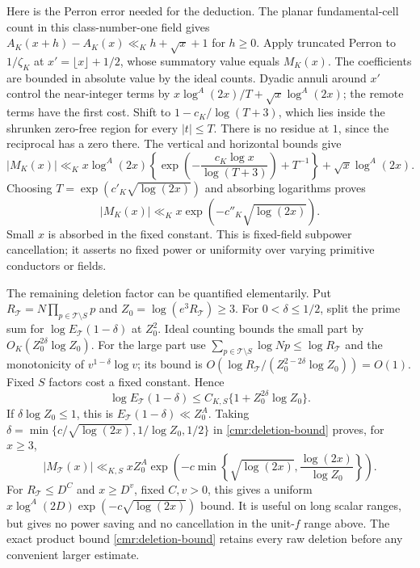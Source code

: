 \documentclass[11pt]{article}
\theoremstyle{definition}\newtheorem{definition}[theorem]{Definition}
\theoremstyle{remark}\newtheorem{remark}[theorem]{Remark}
\begin{document}
Here is the Perron error needed for the deduction. The planar
fundamental-cell count in this class-number-one field gives
$A_K(x+h)-A_K(x)\ll_K h+\sqrt x+1$ for $h\ge0$.
Apply truncated Perron to $1/\zeta_K$ at
$x'=\lfloor x\rfloor+1/2$, whose summatory value equals $M_K(x)$.
The coefficients are bounded in absolute value by the ideal counts.
Dyadic annuli around $x'$ control the near-integer terms by
$x\log^A(2x)/T+\sqrt x\log^A(2x)$; the remote terms have the first
cost. Shift to $1-c_K/\log(T+3)$, which lies inside the shrunken
zero-free region for every $|t|\le T$.
There is no residue at $1$, since the reciprocal has a zero there.
The vertical and horizontal bounds give
\[
 |M_K(x)|\ll_K x\log^A(2x)
 \left\{\exp\left(-\frac{c_K\log x}{\log(T+3)}\right)+T^{-1}\right\}
       +\sqrt x\log^A(2x).
\]
Choosing $T=\exp(c'_K\sqrt{\log(2x)})$ and absorbing logarithms proves
\begin{equation}\label{cmr:fixed-mertens}
 |M_K(x)|\ll_K x\exp(-c''_K\sqrt{\log(2x)}).
\end{equation}
Small $x$ is absorbed in the fixed constant. This is fixed-field
subpower cancellation; it asserts no fixed power or uniformity over
varying primitive conductors or fields.

The remaining deletion factor can be quantified elementarily. Put
$R_{\mathcal T}=N\prod_{p\in\mathcal T\setminus S}p$ and
$Z_0=\log(e^3R_{\mathcal T})\ge3$. For $0<\delta\le1/2$, split the
prime sum for $\log E_{\mathcal T}(1-\delta)$ at $Z_0^2$.
Ideal counting bounds the small part by
$O_K(Z_0^{2\delta}\log Z_0)$. For the large part use
$\sum_{p\in\mathcal T\setminus S}\log Np\le\log R_{\mathcal T}$
and the monotonicity of $v^{1-\delta}\log v$; its bound is
$O(\log R_{\mathcal T}/(Z_0^{2-2\delta}\log Z_0))=O(1)$.
Fixed $S$ factors cost a fixed constant. Hence
\[
 \log E_{\mathcal T}(1-\delta)
       \le C_{K,S}\{1+Z_0^{2\delta}\log Z_0\}.
\]
If $\delta\log Z_0\le1$, this is $E_{\mathcal T}(1-\delta)\ll Z_0^A$.
Taking $\delta=\min\{c/\sqrt{\log(2x)},1/\log Z_0,1/2\}$ in
\eqref{cmr:deletion-bound} proves, for $x\ge3$,
\begin{equation}\label{cmr:uniform-mertens}
 |M_{\mathcal T}(x)|\ll_{K,S}xZ_0^A
 \exp\left(-c\min\left\{\sqrt{\log(2x)},
                          \frac{\log(2x)}{\log Z_0}\right\}\right).
\end{equation}
For $R_{\mathcal T}\le D^C$ and $x\ge D^v$, fixed $C,v>0$,
this gives a uniform $x\log^A(2D)\exp(-c\sqrt{\log(2x)})$ bound.
It is useful on long scalar ranges, but gives no power saving and
no cancellation in the unit-$f$ range above. The exact product bound
\eqref{cmr:deletion-bound} retains every raw deletion before any
convenient larger estimate.
\end{document}
